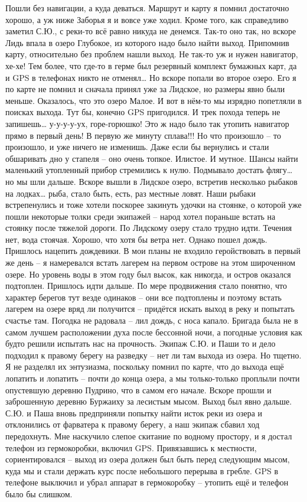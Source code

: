 Пошли без навигации, а куда деваться. Маршрут и карту я помнил достаточно хорошо, а уж ниже Заборья я и вовсе уже ходил. Кроме того, как справедливо заметил С.Ю., с реки-то всё равно никуда не денемся. Так-то оно так, но вскоре Лидь впала в озеро Глубокое, из которого надо было найти выход. Припомнив карту, относительно без проблем нашли выход. Не так-то уж и нужен навигатор, хе-хе! Тем более, что где-то в герме был резервный комплект бумажных карт, да и GPS в телефонах никто не отменял… Но вскоре попали во второе озеро. Его я по карте не помнил и сначала принял уже за Лидское, но размеры явно были меньше. Оказалось, что это озеро Малое. И вот в нём-то мы изрядно попетляли в поисках выхода. Тут бы, конечно GPS пригодился. И трек похода теперь не запишешь… у-у-у-у-ух, горе-горюшко! Это ж надо было так утопить навигатор прямо в первый день! В первую же минуту сплава!!! Но что произошло – то произошло, и уже ничего не изменишь. Даже если бы вернулись и стали обшаривать дно у стапеля – оно очень топкое. Илистое. И мутное. Шансы найти маленький утопленный прибор стремились к нулю. Подмывало достать флягу… но мы шли дальше.
Вскоре вышли в Лидское озеро, встретив несколько рыбаков на лодках… рыба, стало быть, есть, раз местные ловят. Наши рыбаки встрепенулись и тоже хотели поскорее закинуть удочки на стоянке, о которой уже пошли некоторые толки среди экипажей – народ хотел пораньше встать на стоянку после тяжелой дороги. 
По Лидскому озеру стало трудно идти. Течения нет, вода стоячая. Хорошо, что хотя бы ветра нет. Однако пошел дождь. Пришлось нацепить дождевики. В мои планы не входило геройствовать в первый же день – я намеревался встать лагерем на первом острове на этом широченном озере. Но уровень воды в этом году был высок, как никогда, и остров оказался подтоплен. Пришлось идти дальше. По мере продвижения стало понятно, что характер берегов тут везде одинаков – они все подтоплены и поэтому встать лагерем на озере вряд ли получится – придётся искать выход в реку и попытать счастье там. 
Погодка не радовала – лил дождь, с носа капало. Бригада была не в самом лучшем расположении духа после бессонной ночи, а погодные условия как будто решили испытать нас на прочность. Экипаж С.Ю. и Паши то и дело подходил к правому берегу на разведку – нет ли там выхода из озера. Но тщетно. Я не разделял их энтузиазма, поскольку помнил по карте, что до выхода ещё лопатить и лопатить – почти до конца озера, а мы только-только проплыли почти опустевшую деревню Пудрино, что в самом его начале. Вскоре прошли и заброшенную деревню Буржаиху за лесистым мысом. Выход был явно дальше. С.Ю. и Паша вновь предприняли попытку найти исток реки из озера и отклонились от фарватера к правому берегу, а наш экипаж сбавил ход передохнуть. Мне наскучило слепое скитание по водному простору, и я достал телефон из гермокоробки, включил GPS. Привязавшись к местности, сориентировался – выход из озера должен был быть перед следующим мысом, куда мы и стали держать курс после небольшого перерыва в гребле. GPS в телефоне выключил и убрал аппарат в гермокоробку – утопить ещё и телефон было бы слишком.
